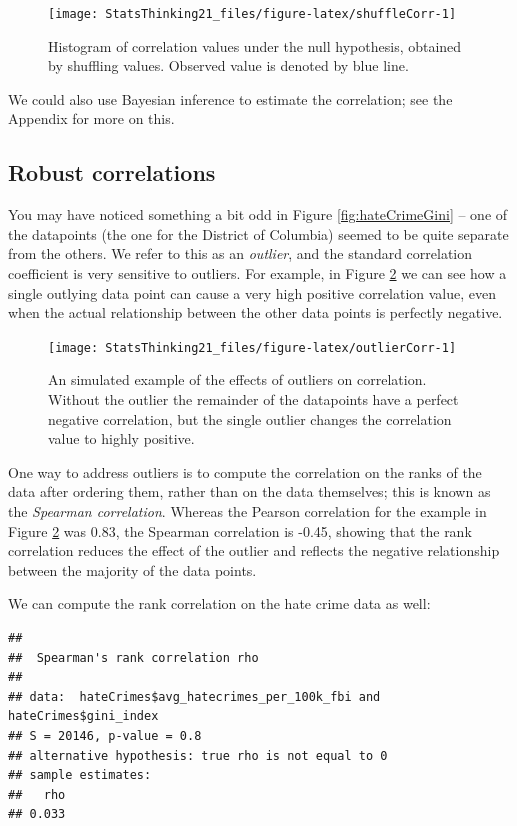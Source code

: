 \documentclass[
  12pt,
]{book}
\begin{document}
\begin{figure}
\texttt{[image: StatsThinking21\_files/figure-latex/shuffleCorr-1]} \caption{Histogram of correlation values under the null hypothesis, obtained by shuffling values. Observed value is denoted by blue line.}\label{fig:shuffleCorr}
\end{figure}

We could also use Bayesian inference to estimate the correlation; see the Appendix for more on this.

\hypertarget{robust-correlations}{%
\subsection{Robust correlations}\label{robust-correlations}}

You may have noticed something a bit odd in Figure \ref{fig:hateCrimeGini} -- one of the datapoints (the one for the District of Columbia) seemed to be quite separate from the others. We refer to this as an \emph{outlier}, and the standard correlation coefficient is very sensitive to outliers. For example, in Figure \ref{fig:outlierCorr} we can see how a single outlying data point can cause a very high positive correlation value, even when the actual relationship between the other data points is perfectly negative.

\begin{figure}
\texttt{[image: StatsThinking21\_files/figure-latex/outlierCorr-1]} \caption{An simulated example of the effects of outliers on correlation.  Without the outlier the remainder of the datapoints have a perfect negative correlation, but the single outlier changes the correlation value to highly positive.}\label{fig:outlierCorr}
\end{figure}

One way to address outliers is to compute the correlation on the ranks of the data after ordering them, rather than on the data themselves; this is known as the \emph{Spearman correlation}. Whereas the Pearson correlation for the example in Figure \ref{fig:outlierCorr} was 0.83, the Spearman correlation is -0.45, showing that the rank correlation reduces the effect of the outlier and reflects the negative relationship between the majority of the data points.

We can compute the rank correlation on the hate crime data as well:

\begin{verbatim}
## 
##  Spearman's rank correlation rho
## 
## data:  hateCrimes$avg_hatecrimes_per_100k_fbi and hateCrimes$gini_index
## S = 20146, p-value = 0.8
## alternative hypothesis: true rho is not equal to 0
## sample estimates:
##   rho 
## 0.033
\end{verbatim}
\end{document}
